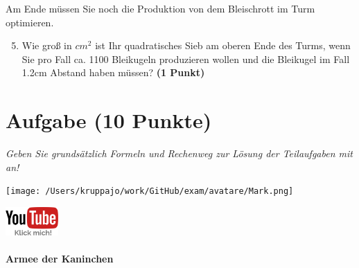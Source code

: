 \documentclass[a4paper, 9pt]{scrartcl}\usepackage[]{graphicx}\usepackage[]{xcolor}
\begin{document}
Am Ende müssen Sie noch die Produktion von dem Bleischrott im Turm optimieren.

\begin{enumerate}
  \setcounter{enumi}{4}
\item Wie gro{\ss} in $cm^2$ ist Ihr quadratisches Sieb am oberen Ende des Turms,
  wenn Sie pro Fall ca. 1100 Bleikugeln produzieren wollen und
  die Bleikugel im Fall 1.2cm Abstand haben müssen?  \textbf{(1
    Punkt)}
\end{enumerate}
 
\clearpage

\section{Aufgabe \hfill (10 Punkte)}

\textit{Geben Sie grundsätzlich Formeln und Rechenweg zur Lösung der Teilaufgaben mit an!} \\[1Ex]
 

 
\ifcollection
\begin{flushright}
\tiny\vspace{-3Ex}
\textbf{\examinhaltstart}
\exammodulemathstat
\vspace{-4Ex}
\end{flushright}
\begin{minipage}[t]{0.5\textwidth}
\texttt{[image: /Users/kruppajo/work/GitHub/exam/avatare/Mark.png]}
\end{minipage}
\begin{minipage}[t]{0.5\textwidth}
\hfill
\href{https://youtu.be/Mr6eslls4J0}{\includegraphics[width = 2cm]{img/youtube}}
\end{minipage}
\fi



\ifcollection
\paragraph{Armee der Kaninchen}
\fi
\end{document}
